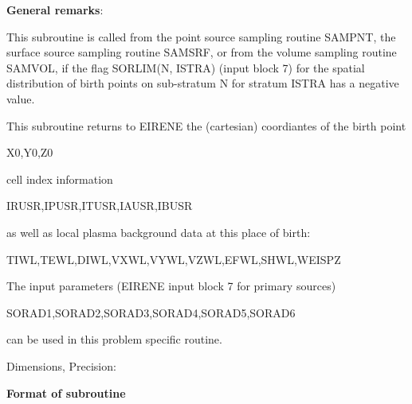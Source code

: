 \medskip

\noindent

{\bf General remarks}:

\medskip

\noindent

This subroutine is called from the point source sampling routine
SAMPNT, the surface source sampling routine SAMSRF, or from the
volume sampling routine SAMVOL, if the flag SORLIM(N, ISTRA)
(input block 7) for the spatial distribution of birth points on
sub-stratum N for stratum ISTRA has a negative value.

This subroutine returns to EIRENE the (cartesian) coordiantes of
the birth point

X0,Y0,Z0

cell index information

IRUSR,IPUSR,ITUSR,IAUSR,IBUSR

as well as local plasma background data at this place of birth:

TIWL,TEWL,DIWL,VXWL,VYWL,VZWL,EFWL,SHWL,WEISPZ

The input parameters (EIRENE input block 7 for primary sources)

SORAD1,SORAD2,SORAD3,SORAD4,SORAD5,SORAD6

can be used in this problem specific routine.

Dimensions, Precision:



\medskip

\noindent

{\bf Format of subroutine}

\medskip

\noindent

